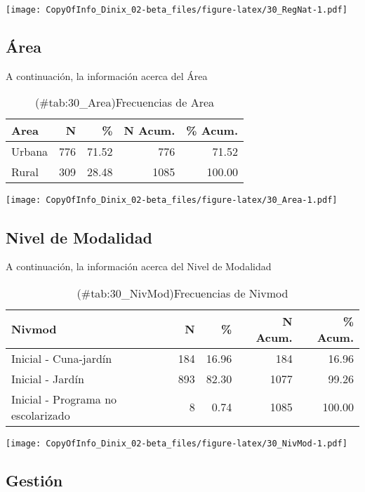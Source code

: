 \documentclass[
]{article}
\begin{document}
\texttt{[image: CopyOfInfo\_Dinix\_02-beta\_files/figure-latex/30\_RegNat-1.pdf]}

\subsection{Área}\label{uxe1rea}

A continuación, la información acerca del Área

\begin{table}

\caption{(\#tab:30_Area)Frecuencias de Area}
\centering
\begin{tabular}[t]{lrrrr}
\toprule
Area & N & \% & N Acum. & \% Acum.\\
\midrule
Urbana & 776 & 71.52 & 776 & 71.52\\
Rural & 309 & 28.48 & 1085 & 100.00\\
\bottomrule
\end{tabular}
\end{table}

\texttt{[image: CopyOfInfo\_Dinix\_02-beta\_files/figure-latex/30\_Area-1.pdf]}

\subsection{Nivel de Modalidad}\label{nivel-de-modalidad}

A continuación, la información acerca del Nivel de Modalidad

\begin{table}

\caption{(\#tab:30_NivMod)Frecuencias de Nivmod}
\centering
\begin{tabular}[t]{lrrrr}
\toprule
Nivmod & N & \% & N Acum. & \% Acum.\\
\midrule
Inicial - Cuna-jardín & 184 & 16.96 & 184 & 16.96\\
Inicial - Jardín & 893 & 82.30 & 1077 & 99.26\\
Inicial - Programa no escolarizado & 8 & 0.74 & 1085 & 100.00\\
\bottomrule
\end{tabular}
\end{table}

\texttt{[image: CopyOfInfo\_Dinix\_02-beta\_files/figure-latex/30\_NivMod-1.pdf]}

\subsection{Gestión}\label{gestiuxf3n}
\end{document}
